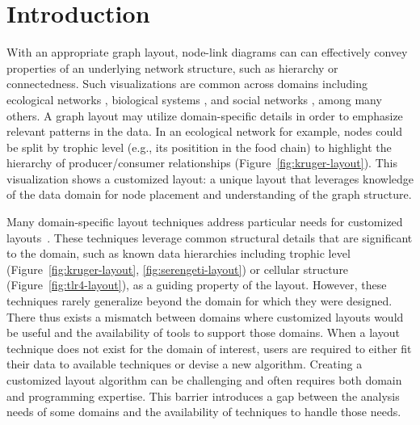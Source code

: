 \section{Introduction}
With an appropriate graph layout, node-link diagrams can
can effectively convey properties of an underlying
network structure, such as hierarchy or connectedness. Such visualizations are common across domains including ecological networks
\cite{hinke2004visualizing,harper2006dynamic,lavigne1996cod,baskerville2011spatial,yodzis1998local,cohen2003ecological,kearney2016blog,benson2016higher,kruger2017},
biological systems
\cite{barsky2008cerebral,shannon2003cytoscape,gehlenborg2010visualization,saraiya2005visualizing,becker2001graph},
and social networks \cite{rothenberg1998using} , among many others. A graph layout may utilize
domain-specific details in order to emphasize relevant patterns in the
data. In an ecological network for example, nodes could be split by trophic
level (e.g., its positition in the food chain) to highlight the hierarchy
of producer/consumer relationships
(Figure~\ref{fig:kruger-layout}). This visualization shows a customized
layout: a unique layout that leverages knowledge of the data domain for
node placement and understanding of the graph structure.

\krugerLayout

Many domain-specific layout techniques address particular needs
for customized layouts~\cite{barsky2008cerebral,shannon2003cytoscape,kearney2017d3,kearney2017ecopath}. These
techniques leverage common structural details that are significant to the
domain, such as known data hierarchies including trophic level
(Figure~\ref{fig:kruger-layout}, \ref{fig:serengeti-layout}) or cellular 
structure (Figure~\ref{fig:tlr4-layout}), as a guiding property of the
layout. However, these techniques rarely generalize beyond the domain for
which they were designed. There thus exists a mismatch between domains
where customized layouts would be useful and the availability of tools to
support those domains. When a layout technique does not exist for the
domain of interest, users are required to either fit their data
to available techniques or devise a new algorithm. Creating a
customized layout algorithm can be challenging and often requires both
domain and programming expertise.
This barrier introduces a gap between
the analysis needs of some domains and the availability of techniques to
handle those needs.


